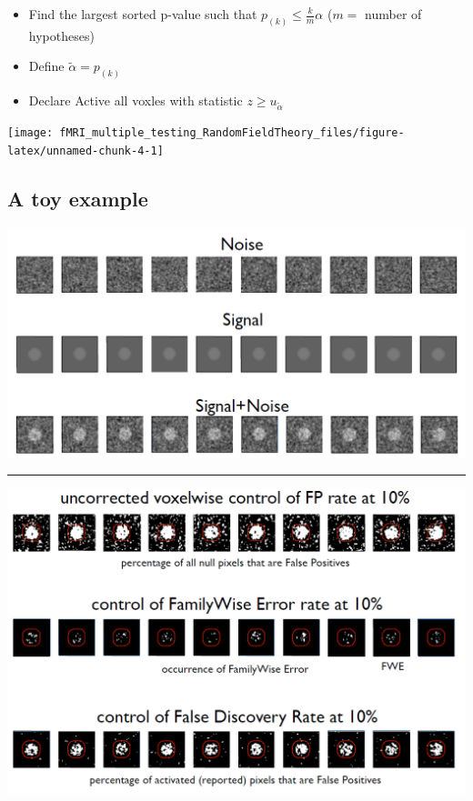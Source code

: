 \documentclass[]{article}
\providecommand{\tightlist}{%
  \setlength{\itemsep}{0pt}\setlength{\parskip}{0pt}}
\begin{document}
\begin{itemize}
\tightlist
\item
  Find the largest sorted p-value such that
  \(p_{(k)} \leq \frac{k}{m}\alpha\) (\(m =\) number of hypotheses)
\item
  Define \(\widetilde{\alpha} = p_{(k)}\)
\item
  Declare Active all voxles with statistic
  \(z \geq u_{\widetilde{\alpha}}\)
\end{itemize}

\begin{center}\texttt{[image: fMRI\_multiple\_testing\_RandomFieldTheory\_files/figure-latex/unnamed-chunk-4-1]} \end{center}

\subsection{A toy example}\label{a-toy-example}

\begin{center}\includegraphics[width=700px]{./figs/sim_es} \end{center}

\begin{center}\rule{0.5\linewidth}{\linethickness}\end{center}

\begin{center}\includegraphics[width=700px]{./figs/sim_es2} \end{center}
\end{document}
